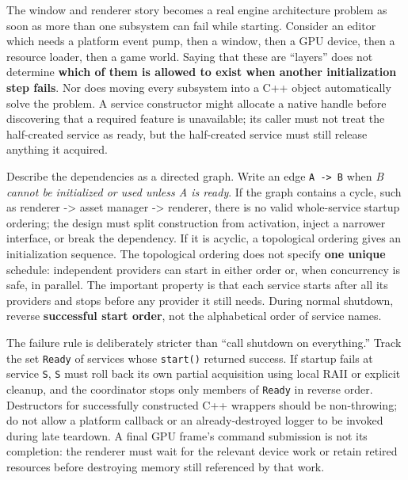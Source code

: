 The window and renderer story becomes a real engine architecture problem as soon as more than one subsystem can fail while starting. Consider an editor which needs a platform event pump, then a window, then a GPU device, then a resource loader, then a game world. Saying that these are ``layers'' does not determine \textbf{which of them is allowed to exist when another initialization step fails}. Nor does moving every subsystem into a C++ object automatically solve the problem. A service constructor might allocate a native handle before discovering that a required feature is unavailable; its caller must not treat the half-created service as ready, but the half-created service must still release anything it acquired.

Describe the dependencies as a directed graph. Write an edge \texttt{A\ -\textgreater{}\ B} when \emph{B cannot be initialized or used unless A is ready}. If the graph contains a cycle, such as renderer -\textgreater{} asset manager -\textgreater{} renderer, there is no valid whole-service startup ordering; the design must split construction from activation, inject a narrower interface, or break the dependency. If it is acyclic, a topological ordering gives an initialization sequence. The topological ordering does not specify \textbf{one unique} schedule: independent providers can start in either order or, when concurrency is safe, in parallel. The important property is that each service starts after all its providers and stops before any provider it still needs. During normal shutdown, reverse \textbf{successful start order}, not the alphabetical order of service names.

The failure rule is deliberately stricter than ``call shutdown on everything.'' Track the set \texttt{Ready} of services whose \texttt{start()} returned success. If startup fails at service \texttt{S}, \texttt{S} must roll back its own partial acquisition using local RAII or explicit cleanup, and the coordinator stops only members of \texttt{Ready} in reverse order. Destructors for successfully constructed C++ wrappers should be non-throwing; do not allow a platform callback or an already-destroyed logger to be invoked during late teardown. A final GPU frame's command submission is not its completion: the renderer must wait for the relevant device work or retain retired resources before destroying memory still referenced by that work.

